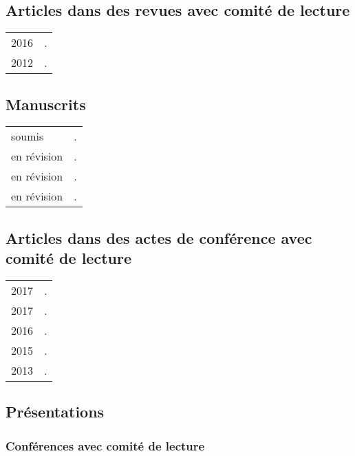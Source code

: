 \documentclass[11pt,a4paper,twoside,french]{article}
\makeatletter
\newenvironment{cvsection}{%
  \setlength{\extrarowheight}{0.70ex}
  \begin{longtable}[l]{@{} L R @{}}
}{%
  \end{longtable}
}
\makeatother
\begin{document}
\subsection*{Articles dans des revues avec comité de lecture}

\begin{cvsection}
  2016 & .\\
  2012 & .\\
\end{cvsection}

\subsection*{Manuscrits}

\begin{cvsection}
  soumis & .\\
  en révision & .\\
  en révision & .\\
  en révision & .\\
\end{cvsection}

\subsection*{Articles dans des actes de conférence avec comité de lecture}

\begin{cvsection}
  2017 & .\\
  2017 & .\\
  2016 & .\\
  2015 & .\\
  2013 & .\\
\end{cvsection}

\subsection*{Présentations}

\subsubsection*{Conférences avec comité de lecture}
\end{document}
